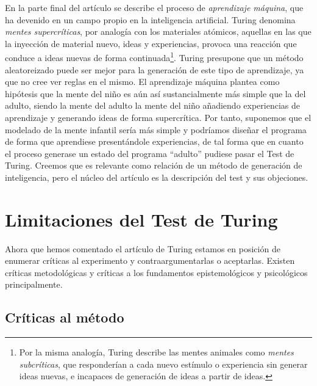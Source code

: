 \documentclass[12pt]{memoir}
\begin{document}
En la parte final del artículo se describe el proceso de \textit{aprendizaje máquina}, que ha devenido en un campo propio en la inteligencia artificial. Turing denomina \textit{mentes supercríticas}, por analogía con los materiales atómicos, aquellas en las que la inyección de material nuevo, ideas y experiencias, provoca una reacción que conduce a ideas nuevas de forma continuada\footnote{Por la misma analogía, Turing describe las mentes animales como \textit{mentes subcríticas}, que responderían a cada nuevo estímulo o experiencia sin generar ideas nuevas, e incapaces de generación de ideas a partir de ideas.}. Turing presupone que un método aleatoreizado puede ser mejor para la generación de este tipo de aprendizaje, ya que no cree ver reglas en el mismo. El aprendizaje máquina  plantea como hipótesis que la mente del niño es aún así sustancialmente más simple que la del adulto, siendo la mente del adulto la mente del niño añadiendo experiencias de aprendizaje y generando ideas de forma supercrítica. Por tanto, suponemos que el modelado de la mente infantil sería más simple y podríamos diseñar el programa de forma que aprendiese presentándole experiencias, de tal forma que en cuanto el proceso generase un estado del programa ``adulto'' pudiese pasar el Test de Turing. Creemos que es relevante como relación de un método de generación de inteligencia, pero el núcleo del artículo es la descripción del test y sus objeciones.


\section{Limitaciones del Test de Turing}

Ahora que hemos comentado el artículo de Turing estamos en posición de enumerar  críticas al experimento y contraargumentarlas o aceptarlas. Existen críticas metodológicas y críticas a los fundamentos epistemológicos y psicológicos principalmente.

\nocite{katrina}
\nocite{afterTuring}
\nocite{turingHarmful}
\nocite{harnad}
\nocite{sep-turing-test}

\subsection{Críticas al método}
\end{document}
